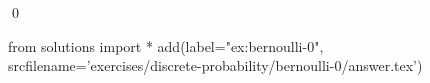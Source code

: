 
\begin{ex} 
  \label{ex:bernoulli-0}
  
  \qed
\end{ex} 
\begin{python0}
from solutions import *
add(label="ex:bernoulli-0",
    srcfilename='exercises/discrete-probability/bernoulli-0/answer.tex') 
\end{python0}
